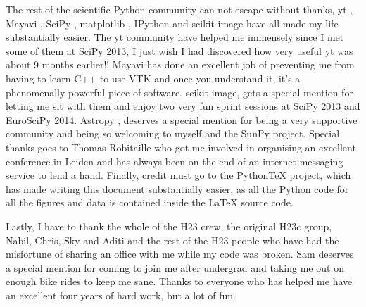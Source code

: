 \begin{acknowledgements}
The rest of the scientific Python community can not escape without thanks, yt \citep{turk2011}, Mayavi \citep{ramachandran2011}, SciPy \citep{jones2001}, matplotlib \citep{hunter2007}, IPython \citep{perez2007} and scikit-image \citep{vanderwalt2014} have all made my life substantially easier.
The yt community have helped me immensely since I met some of them at SciPy 2013, I just wish I had discovered how very useful yt was about 9 months earlier!!
Mayavi has done an excellent job of preventing me from having to learn C++ to use VTK and once you understand it, it's a phenomenally powerful piece of software.
scikit-image, gets a special mention for letting me sit with them and enjoy two very fun sprint sessions at SciPy 2013 and EuroSciPy 2014.
Astropy \citep{theastropycollaboration2013}, deserves a special mention for being a very supportive community and being so welcoming to myself and the SunPy project. Special thanks goes to Thomas Robitaille who got me involved in organising an excellent conference in Leiden and has always been on the end of an internet messaging service to lend a hand.
Finally, credit must go to the PythonTeX \citep{poore2013} project, which has made writing this document substantially easier, as all the Python code for all the figures and data is contained inside the LaTeX source code.

Lastly, I have to thank the whole of the H23 crew, the original H23c group, Nabil, Chris, Sky and Aditi and the rest of the H23 people who have had the misfortune of sharing an office with me while my code was broken.
Sam deserves a special mention for coming to join me after undergrad and taking me out on enough bike rides to keep me sane.
Thanks to everyone who has helped me have an excellent four years of hard work, but a lot of fun.


\end{acknowledgements}
